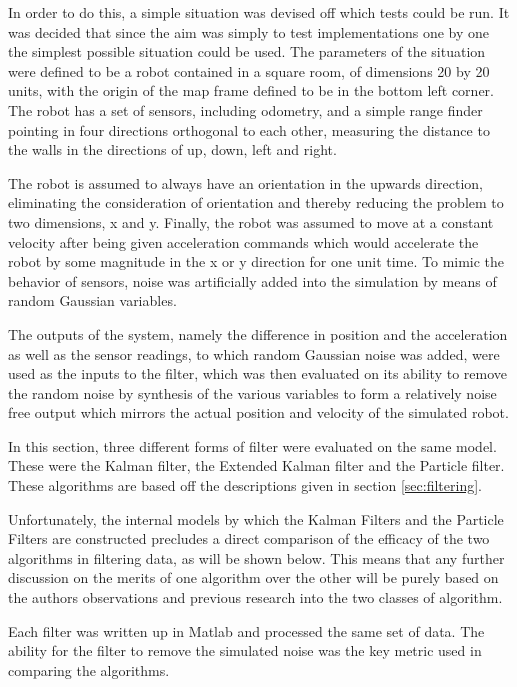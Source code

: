 \documentclass[english]{article}
\begin{document}
In order to do this, a simple situation was devised off which tests could be run. It was decided that since the aim was simply to test implementations one by one the simplest possible situation could be used. The parameters of the situation were defined to be a robot contained in a square room, of dimensions 20 by 20 units, with the origin of the map frame defined to be in the bottom left corner. The robot has a set of sensors, including odometry, and a simple range finder pointing in four directions orthogonal to each other, measuring the distance to the walls in the directions of up, down, left and right. 

The robot is assumed to always have an orientation in the upwards direction, eliminating the consideration of orientation and thereby reducing the problem to two dimensions, x and y. Finally, the robot was assumed to move at a constant velocity after being given acceleration commands which would accelerate the robot by some magnitude in the x or y direction for one unit time. To mimic the behavior of sensors, noise was artificially added into the simulation by means of random Gaussian variables.

The outputs of the system, namely the difference in position and the acceleration as well as the sensor readings, to which random Gaussian noise was added, were used as the inputs to the filter, which was then evaluated on its ability to remove the random noise by synthesis of the various variables to form a relatively noise free output which mirrors the actual position and velocity of the simulated robot.

In this section, three different forms of filter were evaluated on the same model. These were the Kalman filter, the Extended Kalman filter and the Particle filter. These algorithms are based off the descriptions given in section \ref{sec:filtering}.

Unfortunately, the internal models by which the Kalman Filters and the Particle Filters are constructed precludes a direct comparison of the efficacy of the two algorithms in filtering data, as will be shown below. This means that any further discussion on the merits of one algorithm over the other will be purely based on the authors observations and previous research into the two classes of algorithm.

Each filter was written up in Matlab and processed the same set of data. The ability for the filter to remove the simulated noise was the key metric used in comparing the algorithms.
\end{document}
